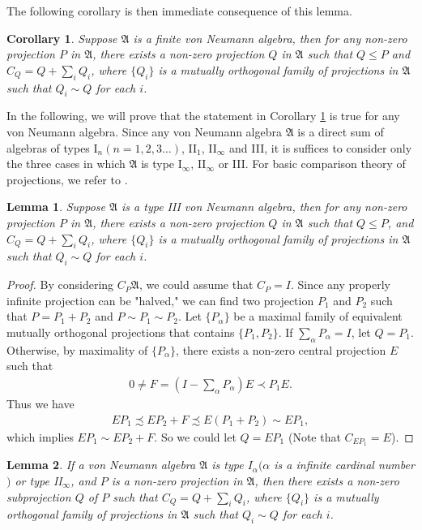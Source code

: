 \documentclass{amsart}
\newcommand{\AAA}{\mathfrak A}
\newtheorem{corollary}{Corollary}[section]
\newtheorem{lemma}{Lemma}[section]
\begin{document}
The following corollary is then immediate consequence of this lemma.

\begin{corollary}\label{acor1}
Suppose $\AAA$ is a finite von Neumann algebra, then for any non-zero projection $P$ in $\AAA$, there exists a non-zero projection $Q$ in $\AAA$
such that  $Q \leq P$ and $C_{Q} = Q + \sum_{i}Q_i$, where $\{Q_i\}$ is a mutually orthogonal family of projections in $\AAA$ such that $Q_i \sim Q$ for 
each $i$.   
\end{corollary}

In the following, we will prove that the statement in Corollary \ref{acor1} is true for any von Neumann algebra. 
Since any von Neumann algebra $\AAA$ is a direct 
sum of algebras of  types I$_{n} ( n = 1, 2, 3 \ldots)$, II$_1$, II$_{\infty}$ and III,  it is suffices to consider
only the three cases in which $\AAA$ is type I$_{\infty}$, II$_{\infty}$ or III. For basic comparison theory of
projections, we refer to \cite{RK}.

\begin{lemma}\label{alemma5}
Suppose $\AAA$ is a type III von Neumann algebra, then for any non-zero projection $P$ in $\AAA$,  there exists a non-zero projection $Q$ in $\AAA$
such that  $Q \leq P$, and $C_{Q} = Q + \sum_{i}Q_i$, where $\{Q_i\}$ is a mutually orthogonal family of projections in $\AAA$ such that $Q_i \sim Q$ for 
each $i$.   
\end{lemma}

\begin{proof}
By considering $C_P \AAA$, we could assume that $C_P = I$. Since any properly infinite projection can be "halved," 
we can find two projection $P_1$ and $P_2$ such that $P = P_1 + P_2$ and $P \sim P_1 \sim P_2$. 
Let $\{P_\alpha \}$ be a maximal family of equivalent mutually orthogonal projections that contains
$\{P_1, P_2\}$. If $\sum_{\alpha} P_\alpha = I$, let $Q = P_1$. Otherwise, by maximality of $\{P_{\alpha} \}$, 
there exists a non-zero central projection $E$ such that
\begin{align*}
0 \neq F = (I - \sum_{\alpha} P_\alpha)E \prec P_1 E.
\end{align*}
Thus we have
\begin{align*}
EP_1 \precsim EP_2 + F \precsim E(P_1 + P_2) \sim EP_1,
\end{align*}
which implies $EP_1 \sim EP_2 + F$. So we could let $Q = EP_1$ (Note that $C_{EP_1} = E$).
\end{proof}

\begin{lemma}\label{alemma6}
If a von Neumann algebra $\AAA$ is type $I_{\alpha}$$(\alpha$ is a infinite cardinal number$)$ or type II$_{\infty}$, and $P$ is a non-zero projection in $\AAA$, 
then there exists a non-zero subprojection $Q$ of $P$ such that $C_{Q} = Q + \sum_{i}Q_i$, where $\{Q_i\}$ is a mutually orthogonal family of projections in $\AAA$ such that $Q_i \sim Q$ for 
each $i$.   
\end{lemma}
\end{document}
